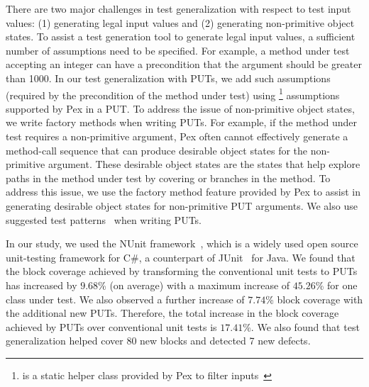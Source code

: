 There are two major challenges in test generalization with respect to test input values: (1) generating legal input values and (2) generating non-primitive object states. To assist a test generation tool to generate legal input values, a sufficient number of assumptions need to be specified.  For example, a method under test accepting an integer can have a precondition that the argument should be greater than 1000. In our test generalization with PUTs, we add such assumptions (required by the precondition of the method under test) using \footnote{ is a static helper class provided by Pex to filter inputs~\cite{PEXDOC}} assumptions supported by Pex in a PUT. To address the issue of non-primitive object states, we write factory methods when writing PUTs. For example, if the method under test requires a non-primitive argument, Pex often cannot effectively generate a method-call sequence that can produce desirable object states for the non-primitive argument. These desirable object states are the states that help explore paths in the method under test by covering  or  branches in the method. To address this issue, we use the factory method feature provided by Pex to assist in generating desirable object states for non-primitive PUT arguments.  We also use suggested test patterns~\cite{halleux08:putpatterns} when writing PUTs.

In our study, we used the NUnit framework~\cite{nunit}, which  is a widely used open source unit-testing framework for C\#, a counterpart of JUnit~\cite{JUnit} for Java. We found that the block coverage achieved by transforming the conventional unit tests to PUTs has increased by $9.68$\% (on average) with a maximum increase of $45.26$\% for one class under test. We also observed a further increase of $7.74$\%  block coverage with the additional new PUTs. Therefore, the total increase in the block coverage achieved by PUTs over conventional unit tests is $17.41$\%. We also found that test generalization helped cover $80$ new blocks and detected 7 new defects.

